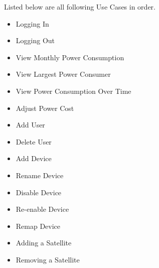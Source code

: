 Listed below are all following Use Cases in order.
\begin{itemize}
	\item Logging In
	\item Logging Out
	\item View Monthly Power Consumption
	\item View Largest Power Consumer
	\item View Power Consumption Over Time
	\item Adjust Power Cost
	\item Add User
	\item Delete User
	\item Add Device
	\item Rename Device
	\item Disable Device
	\item Re-enable Device
	\item Remap Device
	\item Adding a Satellite
	\item Removing a Satellite
\end{itemize}